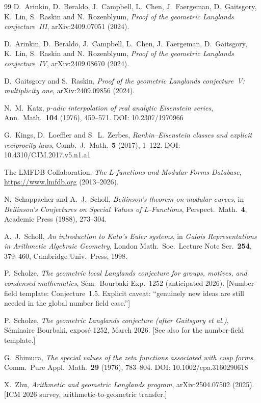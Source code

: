 \documentclass[12pt]{amsart}
\theoremstyle{definition}
\begin{document}
\begin{thebibliography}{99}
D.~Arinkin, D.~Beraldo, J.~Campbell, L.~Chen, J.~Faergeman,
D.~Gaitsgory, K.~Lin, S.~Raskin and N.~Rozenblyum,
\emph{Proof of the geometric Langlands conjecture~III},
arXiv:2409.07051 (2024).

D.~Arinkin, D.~Beraldo, J.~Campbell, L.~Chen, J.~Faergeman,
D.~Gaitsgory, K.~Lin, S.~Raskin and N.~Rozenblyum,
\emph{Proof of the geometric Langlands conjecture~IV},
arXiv:2409.08670 (2024).

D.~Gaitsgory and S.~Raskin,
\emph{Proof of the geometric Langlands conjecture~V:
  multiplicity one},
arXiv:2409.09856 (2024).

N.~M.~Katz,
\emph{$p$-adic interpolation of real analytic Eisenstein series},
Ann.\ Math.\ \textbf{104} (1976), 459--571.
DOI: 10.2307/1970966

G.~Kings, D.~Loeffler and S.~L.~Zerbes,
\emph{Rankin--Eisenstein classes and explicit reciprocity laws},
Camb.\ J.\ Math.\ \textbf{5} (2017), 1--122.
DOI: 10.4310/CJM.2017.v5.n1.a1

The LMFDB Collaboration,
\emph{The $L$-functions and Modular Forms Database},
\url{https://www.lmfdb.org} (2013--2026).

N.~Schappacher and A.~J.~Scholl,
\emph{Beilinson's theorem on modular curves},
in \emph{Beilinson's Conjectures on Special Values of $L$-Functions},
Perspect.\ Math.\ \textbf{4}, Academic Press (1988), 273--304.

A.~J.~Scholl,
\emph{An introduction to Kato's Euler systems},
in \emph{Galois Representations in Arithmetic Algebraic Geometry},
London Math.\ Soc.\ Lecture Note Ser.\ \textbf{254}, 379--460,
Cambridge Univ.\ Press, 1998.

P.~Scholze,
\emph{The geometric local Langlands conjecture for groups, motives, and
condensed mathematics},
S\'em.\ Bourbaki Exp.~1252 (anticipated 2026).
[Number-field template: Conjecture~1.5.  Explicit caveat: ``genuinely new
ideas are still needed in the global number field case.'']

P.~Scholze,
\emph{The geometric Langlands conjecture (after Gaitsgory et al.)},
S\'eminaire Bourbaki, expos\'e 1252, March 2026.
[See also \cite{Scholze1252} for the number-field template.]

G.~Shimura,
\emph{The special values of the zeta functions associated with cusp forms},
Comm.\ Pure Appl.\ Math.\ \textbf{29} (1976), 783--804.
DOI: 10.1002/cpa.3160290618

X.~Zhu,
\emph{Arithmetic and geometric Langlands program},
arXiv:2504.07502 (2025).
[ICM 2026 survey, arithmetic-to-geometric transfer.]

\end{thebibliography}
\end{document}
